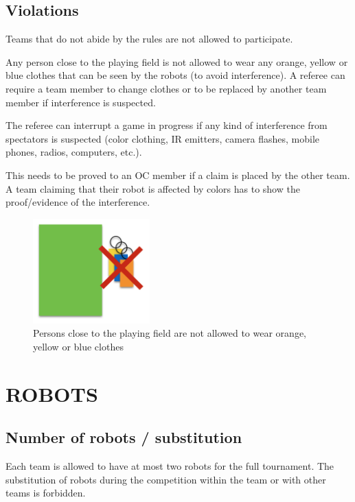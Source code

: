 \documentclass{article}
\begin{document}
\subsection{Violations \label{ref-violations}}

Teams that do not abide by the rules are not allowed to participate.

Any person close to the playing field is not allowed to wear any orange, yellow
or blue clothes that can be seen by the robots (to avoid interference). A
referee can require a team member to change clothes or to be replaced by
another team member if interference is suspected.

The referee can interrupt a game in progress if any kind of interference from
spectators is suspected (color clothing, IR emitters, camera flashes, mobile
phones, radios, computers, etc.).

This needs to be proved to an OC member if a claim is placed by the other team.
A team claiming that their robot is affected by colors has to show the
proof/evidence of the interference.

\begin{figure}[H]
    \centering
    \includegraphics[width=0.4\textwidth]{media/image2.png}
    \caption{Persons close to the playing field are not allowed to wear orange,
        yellow or blue clothes}
    \label{fig:spectators}
\end{figure}


\section{ROBOTS\label{ref-018}}

\subsection{ Number of robots / substitution \label{ref-number-of-robots}}

Each team is allowed to have at most two robots for the full tournament. The
substitution of robots during the competition within the team or with other
teams is forbidden.
\end{document}

